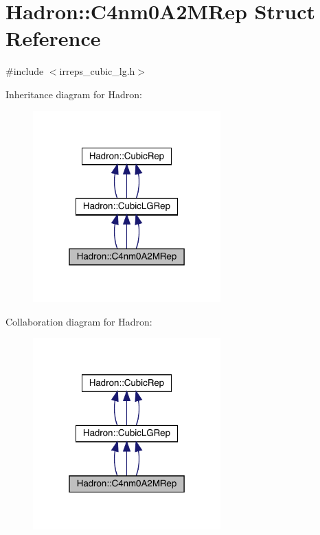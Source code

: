 \hypertarget{structHadron_1_1C4nm0A2MRep}{}\section{Hadron\+:\+:C4nm0\+A2\+M\+Rep Struct Reference}
\label{structHadron_1_1C4nm0A2MRep}


{\ttfamily \#include $<$irreps\+\_\+cubic\+\_\+lg.\+h$>$}



Inheritance diagram for Hadron\+:
\nopagebreak
\begin{figure}[H]
\begin{center}
\leavevmode
\includegraphics[width=205pt]{dd/d8f/structHadron_1_1C4nm0A2MRep__inherit__graph}
\end{center}
\end{figure}


Collaboration diagram for Hadron\+:
\nopagebreak
\begin{figure}[H]
\begin{center}
\leavevmode
\includegraphics[width=205pt]{d5/d6a/structHadron_1_1C4nm0A2MRep__coll__graph}
\end{center}
\end{figure}
